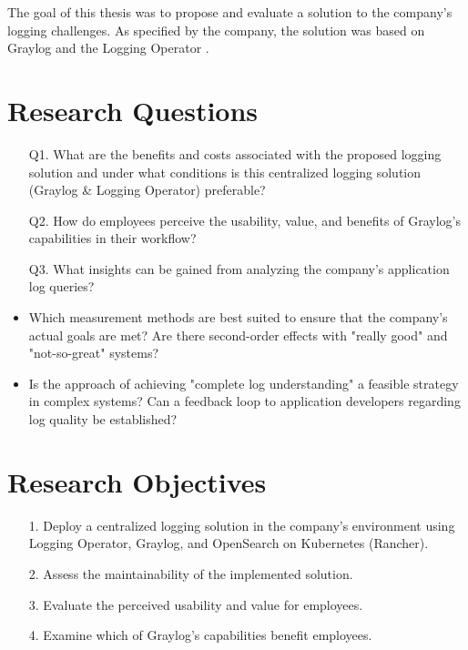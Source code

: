 \documentclass[../main.tex]{subfiles}
\begin{document}
The goal of this thesis was to propose and evaluate a solution to the company's logging challenges. As specified by the company, the solution was based on Graylog \cite{graylog} and the Logging Operator \cite{logoperator}.

\section{Research Questions}

\begin{itemize}

\item[Q1.] What are the benefits and costs associated with the proposed logging solution and under what conditions is this centralized logging solution (Graylog \& Logging Operator) preferable?

\item[Q2.] How do employees perceive the usability, value, and benefits of Graylog's capabilities in their workflow?
\item[Q3.] What insights can be gained from analyzing the company's application log queries?

\item Which measurement methods are best suited to ensure that the company's actual goals are met?
Are there second-order effects with "really good" and "not-so-great" systems?

\item Is the approach of achieving "complete log understanding" a feasible strategy in complex systems?
Can a feedback loop to application developers regarding log quality be established?

\end{itemize}

\section{Research Objectives}

\begin{itemize}
\item[1.] Deploy a centralized logging solution in the company's environment using Logging Operator, Graylog, and OpenSearch on Kubernetes (Rancher).
\item[2.] Assess the maintainability of the implemented solution.
\item[3.] Evaluate the perceived usability and value for employees. 
\item[4.] Examine which of Graylog's capabilities benefit employees.
\end{itemize}
\end{document}
